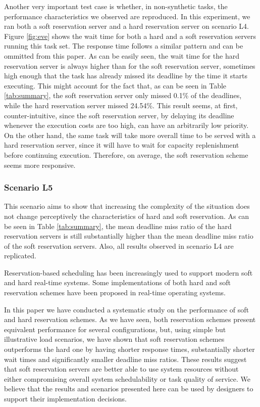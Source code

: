 \documentclass[times, 10pt,twocolumn]{article}
\begin{document}
Another very important test case is whether, in non-synthetic tasks,
the performance characteristics we observed are reproduced. In this
experiment, we ran both a soft reservation server and a hard
reservation server on scenario L4. Figure \ref{fig:eve} shows the wait
time for both a hard and a soft reservation servers running this task
set. The response time follows a similar pattern and can be ommitted
from this paper. As can be easily seen, the wait time for the hard
reservation server is always higher than for the soft reservation
server, sometimes high enough that the task has already missed its
deadline by the time it starts executing. This might account for the
fact that, as can be seen in Table \ref{tab:summary}, the soft
reservation server only missed 0.1\% of the deadlines, while the hard
reservation server missed 24.54\%. This result seems, at first,
counter-intuitive, since the soft reservation server, by delaying its
deadline whenever the execution costs are too high, can have an
arbitrarily low priority. On the other hand, the same task will take
more overall time to be served with a hard reservation server, since
it will have to wait for capacity replenishment before continuing
execution. Therefore, on average, the soft reservation scheme seems
more responsive.

\subsubsection{Scenario L5}
\label{sec:scenario-l5}

This scenario aims to show that increasing the complexity of the
situation does not change perceptively the characteristics of hard and
soft reservation. As can be seen in Table \ref{tab:summary}, the mean
deadline miss ratio of the hard reservation servers is still
substantially higher than the mean deadline miss ratio of the soft
reservation servers. Also, all results observed in scenario L4 are
replicated.

\label{sec:conclusion}

Reservation-based scheduling has been increasingly used to support
modern soft and hard real-time systems. Some implementations of both
hard and soft reservation schemes have been proposed in real-time
operating systems.

In this paper we have conducted a systematic study on the performance
of soft and hard reservation schemes. As we have seen, both
reservation schemes present equivalent performance for several
configurations, but, using simple but illustrative load scenarios, we
have shown that soft reservation schemes outperforms the hard one by
having shorter response times, substantially shorter wait times and
significantly smaller deadline miss ratios. These results suggest that
soft reservation servers are better able to use system resources
without either compromising overall system schedulability or task
quality of service. We believe that the results and scenarios
presented here can be used by designers to support their
implementation decisions.



\end{document}
